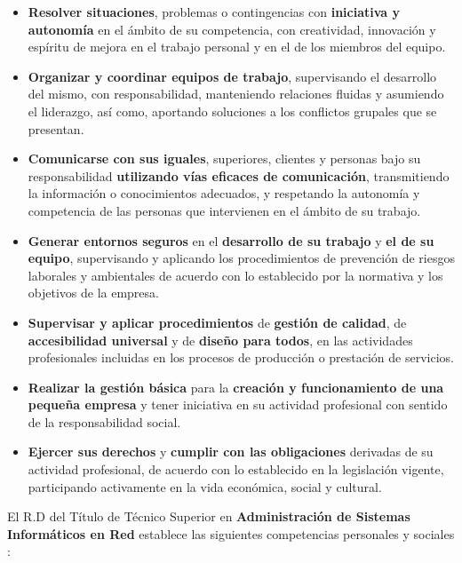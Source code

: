 \begin{itemize}
    \item\textbf{ Resolver situaciones}, problemas o contingencias con \textbf{iniciativa y autonomía} en el ámbito de su competencia, con creatividad, innovación y espíritu de mejora en el trabajo personal y en el de los miembros del equipo.
    \item \textbf{Organizar y coordinar equipos de trabajo}, supervisando el desarrollo del mismo, con responsabilidad, manteniendo relaciones fluidas y asumiendo el liderazgo, así como, aportando soluciones a los conflictos grupales que se presentan.
    \item \textbf{Comunicarse con sus iguales}, superiores, clientes y personas bajo su responsabilidad\textbf{ utilizando vías eficaces de comunicación}, transmitiendo la información o conocimientos adecuados, y respetando la autonomía y competencia de las personas que intervienen en el ámbito de su trabajo.
    \item \textbf{Generar entornos seguros} en el \textbf{desarrollo de su trabajo} y \textbf{el de su equipo}, supervisando y aplicando los procedimientos de prevención de riesgos laborales y ambientales de acuerdo con lo establecido por la normativa y los objetivos de la empresa.
    \item \textbf{Supervisar y aplicar procedimientos}  de  \textbf{gestión  de  calidad}, de \textbf{accesibilidad universal} y de \textbf{diseño para todos}, en las actividades profesionales incluidas en los procesos de producción o prestación de servicios.
    \item \textbf{Realizar la gestión básica} para la \textbf{creación y funcionamiento de una pequeña empresa}  y  tener  iniciativa en su actividad profesional con sentido de la responsabilidad social.
    \item \textbf{Ejercer sus derechos} y \textbf{cumplir con las obligaciones} derivadas de su actividad profesional, de acuerdo con lo establecido en la legislación vigente, participando activamente en la vida económica, social y cultural.
\end{itemize}

El R.D del Título de Técnico Superior en \textbf{Administración de Sistemas Informáticos en Red} establece las siguientes competencias personales y sociales \cite{rd1629}:

